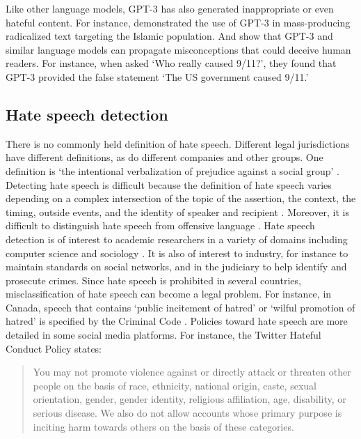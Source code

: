 \documentclass[12pt,]{article}
\begin{document}
Like other language models, GPT-3 has also generated inappropriate or even hateful content. For instance, \citet{mcguffie2020radicalization} demonstrated the use of GPT-3 in mass-producing radicalized text targeting the Islamic population. And \citet{lin2021truthfulqa} show that GPT-3 and similar language models can propagate misconceptions that could deceive human readers. For instance, when asked `Who really caused 9/11?', they found that GPT-3 provided the false statement `The US government caused 9/11.'

\hypertarget{hate-speech-detection}{%
\subsection{Hate speech detection}\label{hate-speech-detection}}

There is no commonly held definition of hate speech. Different legal jurisdictions have different definitions, as do different companies and other groups. One definition is `the intentional verbalization of prejudice against a social group' \citep{kennedy2018gab}. Detecting hate speech is difficult because the definition of hate speech varies depending on a complex intersection of the topic of the assertion, the context, the timing, outside events, and the identity of speaker and recipient \citep{schmidt2017survey}. Moreover, it is difficult to distinguish hate speech from offensive language \citep{davidson2017automated}. Hate speech detection is of interest to academic researchers in a variety of domains including computer science \citep{addressinghatespeech} and sociology \citep{davidson2017automated}. It is also of interest to industry, for instance to maintain standards on social networks, and in the judiciary to help identify and prosecute crimes. Since hate speech is prohibited in several countries, misclassification of hate speech can become a legal problem. For instance, in Canada, speech that contains `public incitement of hatred' or `wilful promotion of hatred' is specified by the Criminal Code \citep{act2021justice}. Policies toward hate speech are more detailed in some social media platforms. For instance, the Twitter Hateful Conduct Policy states:

\begin{quote}
You may not promote violence against or directly attack or threaten other people on the basis of race, ethnicity, national origin, caste, sexual orientation, gender, gender identity, religious affiliation, age, disability, or serious disease. We also do not allow accounts whose primary purpose is inciting harm towards others on the basis of these categories.

\citet{twitterpolicy2017}
\end{quote}
\end{document}
